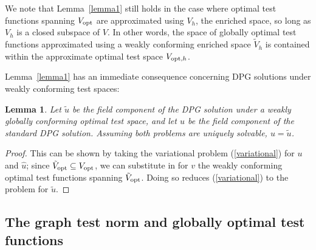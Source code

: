 \documentclass[11pt,onecolumn]{scrartcl}
\newtheorem{lemma}{Lemma}
\begin{document}
We note that Lemma~\ref{lemma1} still holds in the case where optimal test functions spanning $V_{\rm opt}$ are approximated using $V_h$, the enriched space, so long as $V_h$ is a closed subspace of $V$.  In other words, the space of globally optimal test functions approximated using a weakly conforming enriched space $\tilde{V}_h$ is contained within the approximate optimal test space $V_{{\rm opt},h}$.  

Lemma~\ref{lemma1} has an immediate consequence concerning DPG solutions under weakly conforming test spaces: 
\begin{lemma}
\label{remark1}
Let $\tilde{u}$ be the field component of the DPG solution under a weakly globally conforming optimal test space, and let $u$ be the field component of the standard DPG solution.  Assuming both problems are uniquely solvable, $u = \tilde{u}$.  
\end{lemma}
\begin{proof}
This can be shown by taking the variational problem (\ref{variational}) for $u$ and $\widehat{u}$; since $\tilde{V}_{\rm opt} \subseteq V_{\rm opt}$, we can substitute in for $v$ the weakly conforming optimal test functions spanning $\tilde{V}_{\rm opt}$. Doing so reduces (\ref{variational}) to the problem for $\tilde{u}$.   
\end{proof}

\subsection{The graph test norm and globally optimal test functions}
\end{document}
